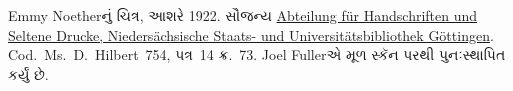 Emmy Noetherનું ચિત્ર, આશરે 1922. સૌજન્ય
\href{http://www.sub.uni-goettingen.de/en/contact/departments-a-z/departmental-and-unit-details/abteilunggruppe/handschriften-und-seltene-drucke/}{Abteilung
f\"ur Handschriften und Seltene Drucke, Nieders\"achsische Staats- und
Universit\"atsbibliothek G\"ottingen}. Cod.~Ms.~D.~Hilbert~754, પત્ર~14 ક્ર.~73.
Joel Fullerએ મૂળ સ્કૅન પરથી પુનઃસ્થાપિત કર્યું છે.
